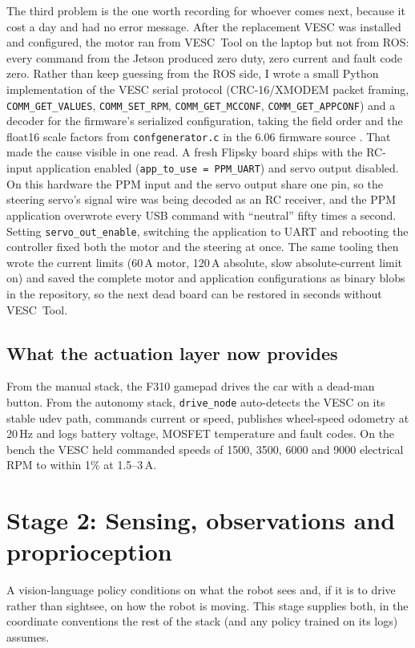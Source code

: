 \documentclass[12pt]{article}
\begin{document}
The third problem is the one worth recording for whoever comes next, because it cost a
day and had no error message. After the replacement VESC was installed and configured,
the motor ran from VESC~Tool on the laptop but not from ROS: every command from the
Jetson produced zero duty, zero current and fault code zero. Rather than keep guessing
from the ROS side, I wrote a small Python implementation of the VESC serial protocol
(CRC-16/XMODEM packet framing, \texttt{COMM\_GET\_VALUES}, \texttt{COMM\_SET\_RPM},
\texttt{COMM\_GET\_MCCONF}, \texttt{COMM\_GET\_APPCONF}) and a decoder for the firmware's
serialized configuration, taking the field order and the float16 scale factors from
\texttt{confgenerator.c} in the 6.06 firmware source \cite{bldc}. That made the cause
visible in one read. A fresh Flipsky board ships with the RC-input application enabled
(\texttt{app\_to\_use = PPM\_UART}) and servo output disabled. On this hardware the
PPM input and the servo output share one pin, so the steering servo's signal wire was
being decoded as an RC receiver, and the PPM application overwrote every USB command with
``neutral'' fifty times a second. Setting \texttt{servo\_out\_enable}, switching the
application to UART and rebooting the controller fixed both the motor and the steering
at once. The same tooling then wrote the current limits (60\,A motor, 120\,A absolute,
slow absolute-current limit on) and saved the complete motor and application
configurations as binary blobs in the repository, so the next dead board can be restored
in seconds without VESC~Tool.

\subsection*{What the actuation layer now provides}

From the manual stack, the F310 gamepad drives the car with a dead-man button. From the
autonomy stack, \texttt{drive\_node} auto-detects the VESC on its stable udev path,
commands current or speed, publishes wheel-speed odometry at 20\,Hz and logs battery
voltage, MOSFET temperature and fault codes. On the bench the VESC held commanded speeds
of 1500, 3500, 6000 and 9000 electrical RPM to within 1\% at 1.5--3\,A.

\section*{Stage 2: Sensing, observations and proprioception}

A vision-language policy conditions on what the robot sees and, if it is to drive
rather than sightsee, on how the robot is moving. This stage supplies both, in the
coordinate conventions the rest of the stack (and any policy trained on its logs)
assumes.
\end{document}

